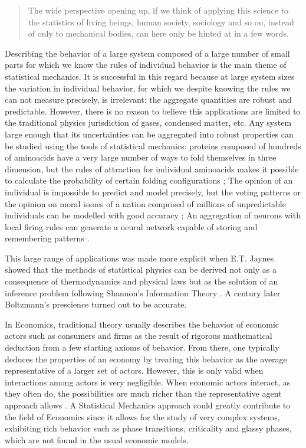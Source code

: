 \begin{quote}
The wide perspective opening up, if we think of applying this science
to the statistics of living beings, human society, sociology and so
on, instead of only to mechanical bodies, can here only be hinted at
in a few words. \cite{Boltzmann}
\end{quote}


Describing the behavior of a large system composed of a large number of small parts for which we know the rules of individual behavior is the main theme of statistical mechanics. It is successful in this regard because at large system sizes the variation in individual behavior, for which we despite knowing the rules we can not measure precisely, is irrelevant: the aggregate quantities are robust and predictable. However, there is no reason to believe this applications are limited to the traditional physics jurisdiction of gases, condensed matter, etc. Any system large enough that its uncertainties can be aggregated into robust properties can be studied using the tools of statistical mechanics: proteins composed of hundreds of aminoacids have a very large number of ways to fold themselves in three dimension, but the rules of attraction for individual aminoacids makes it possible to calculate the probability of certain folding configurations \cite{bryngelson1987}; The opinion of an individual is impossible to predict and model precisely, but the voting patterns or the opinion on moral issues of a nation comprised of millions of unpredictable individuals can be modelled with good accuracy \cite{galam2008, Jerico14}; An aggregation of neurons with local firing rules can generate a neural network capable of storing and remembering patterns \cite{hopfield1982}.

This large range of applications was made more explicit when E.T. Jaynes showed that the methods of statistical physics can be derived not only as a consequence of thermodynamics and physical laws but as the solution of an inference problem following Shannon's Information Theory \cite{Jaynes57}. A century later Boltzmann's prescience turned out to be accurate.

In Economics, traditional theory usually describes the behavior of economic actors such as consumers and firms as the result of rigorous mathematical deduction from a few starting axioms of behavior. From there, one typically deduces the properties of an economy by treating this behavior as the average representative of a larger set of actors. However, this is only valid when interactions among actors is very negligible. When economic actors interact, as they often do, the possibilities are much richer than the representative agent approach allows \cite{Bouchaud13}. A Statistical Mechanics approach could greatly contribute to the field of Economics since it allows for the study of very complex systems, exhibiting rich behavior such as phase transitions, criticality and glassy phases, which are not found in the usual economic models.

